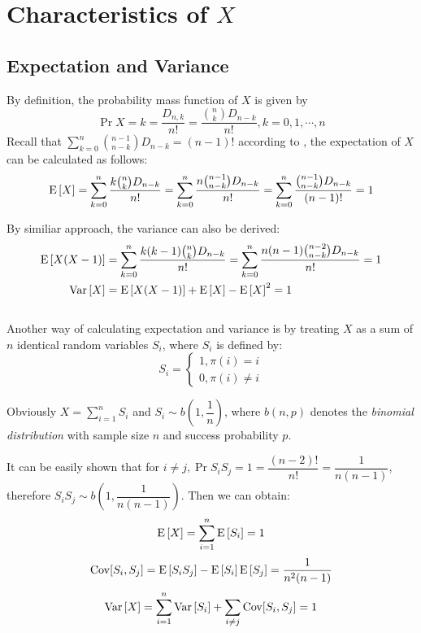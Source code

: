 
\section{Characteristics of $ X$}
\subsection{Expectation and Variance}
\label{f-random}
By definition, the probability mass function of $ X$ is given by
  \begin{equation}
  \Pr{X=k} = \dfrac{D_{n,k}}{n!}=\dfrac{{n\choose{k}}D_{n-k}}{n!}, k = 0,1,\cdots ,n
  \label{eqn:f-pr}
  \end{equation}
Recall that $ \sum_{k=0}^n{n-1 \choose{n-k}}D_{n-k}=(n-1)!$ according to ,
the expectation of $ X$ can be calculated as follows:
\begin{equation}
 \E{X} = \sum_{k=0}^n\dfrac{k{n\choose{k}}D_{n-k}}{n!} = \sum_{k=0}^n\dfrac{n{n-1\choose{n-k}}D_{n-k}}{n!} =
  \sum_{k=0}^n\dfrac{{n-1\choose{n-k}}D_{n-k}}{(n-1)!} = 1
  \label{eqn:exp1}
  \end{equation}

By similiar approach, the variance can also be derived:
\begin{align}
 \E{X(X-1)} &= \sum_{k=0}^n\dfrac{k(k-1){n\choose k}D_{n-k}}{n!}=\sum_{k=0}^n\dfrac{n(n-1){n-2 \choose{n-k}}D_{n-k}}{n!} = 1 \label{eqn:exp2} \\
 \Var{X} &= \E{X(X-1)} + \E{X}-\E{X}^2 = 1 \nonumber
\end{align}
\\

Another way of calculating expectation and variance is by treating $ X$ as a sum of $ n $ identical
random variables $ S_i$, where $ S_i$ is defined by:
\[ S_i = \begin{cases}1, \pi(i)=i\\0,\pi(i)\neq i\end{cases}\]

Obviously $ X = \sum_{i=1}^nS_i$ and $ S_i\sim b(1,\dfrac{1}{n})$, where $ b(n,p)$ denotes the
\emph{binomial distribution} with sample size $ n$ and success probability $ p$.

It can be easily shown that for $ i\neq j, \Pr{S_iS_j=1}=\dfrac{(n-2)!}{n!}=\dfrac{1}{n(n-1)} $, therefore $S_iS_j \sim b(1, \dfrac{1}{n(n-1)})$.
Then we can obtain:
\[ \E{X} = \sum_{i=1}^n\E{S_i} = 1\]
\[ \operatorname{Cov}[S_i,S_j]=\text{E}\left[S_iS_j\right]-\text{E}\left[S_i\right]\text{E}\left[S_j\right]=\dfrac{1}{n^2(n-1)}\]
\[ \Var{X} = \sum_{i=1}^n\Var{S_i}+\sum_{i\neq j}\Cov[S_i,S_j] = 1\]

